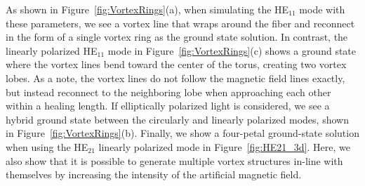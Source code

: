 As shown in Figure~\ref{fig:VortexRings}(a), when simulating the HE$_{11}$ mode with these parameters, we see a vortex line that wraps around the fiber and reconnect in the form of a single vortex ring as the ground state solution.
In contrast, the linearly polarized HE$_{11}$ mode in Figure~\ref{fig:VortexRings}(c) shows a ground state where the vortex lines bend toward the center of the torus, creating two vortex lobes.
As a note, the vortex lines do not follow the magnetic field lines exactly, but instead reconnect to the neighboring lobe when approaching each other within a healing length.
If elliptically polarized light is considered, we see a hybrid ground state between the circularly and linearly polarized modes, shown in Figure~\ref{fig:VortexRings}(b).
Finally, we show a four-petal ground-state solution when using the HE$_{21}$ linearly polarized mode in Figure~\ref{fig:HE21_3d}.
Here, we also show that it is possible to generate multiple vortex structures in-line with themselves by increasing the intensity of the artificial magnetic field.

